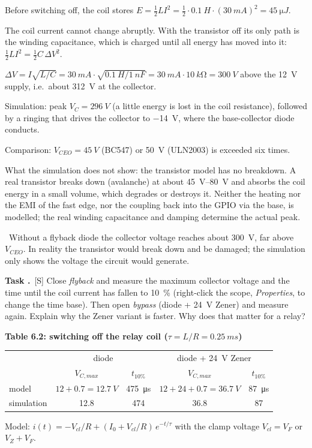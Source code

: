 \documentclass[a4paper,11pt]{article}
\newcounter{task}[section]
\renewcommand{\thetask}{\thesection.\arabic{task}}
\newcommand{\task}[1]{\par\medskip\refstepcounter{task}%
  {\sffamily\bfseries\color{rwuviolet}Task \thetask}\ {\sffamily\small\color{rwucyandark}[#1]}\quad}
\newenvironment{solution}{\begin{solbox}}{\end{solbox}}
\newcommand{\answer}{\par\smallskip{\sffamily\bfseries\color{rwuviolet}Answer:}\ }
\newcommand{\simv}[1]{\textcolor{rwuviolet}{#1}}
\newcommand{\simv}[1]{}
\newenvironment{results}[2]{\par\smallskip\begin{center}\small\sffamily
  {\color{rwucyandark}\bfseries #1}\\[1mm]\renewcommand{\arraystretch}{1.25}\begin{tabular}{#2}\toprule}
  {\bottomrule\end{tabular}\end{center}}
\begin{document}
\begin{solution}
\begin{steps}
  \item Before switching off, the coil stores $E=\tfrac12LI^2=\tfrac12\cdot\SI{0.1}{H}\cdot(\SI{30}{mA})^2=\SI{45}{\micro J}$.
  \item The coil current cannot change abruptly. With the transistor off its only path is the winding
        capacitance, which is charged until all energy has moved into it: $\tfrac12LI^2=\tfrac12C\,\Delta V^2$.
  \item $\Delta V=I\sqrt{L/C}=\SI{30}{mA}\cdot\sqrt{\SI{0.1}{H}/\SI{1}{nF}}=\SI{30}{mA}\cdot\SI{10}{k\ohm}=\SI{300}{V}$
        above the \SI{12}{V} supply, i.e.\ about \SI{312}{V} at the collector.
  \item Simulation: peak $V_C=\SI{296}{V}$ (a little energy is lost in the coil resistance), followed by a
        ringing that drives the collector to \SI{-14}{V}, where the base-collector diode conducts.
  \item Comparison: $V_{CEO}=\SI{45}{V}$ (BC547) or \SI{50}{V} (ULN2003) is exceeded six times.
  \item What the simulation does not show: the transistor model has no breakdown. A real transistor breaks down
        (avalanche) at about \SIrange{45}{80}{V} and absorbs the coil energy in a small volume, which degrades or
        destroys it. Neither the heating nor the EMI of the fast edge, nor the coupling back into the GPIO via
        the base, is modelled; the real winding capacitance and damping determine the actual peak.
\end{steps}
\answer Without a flyback diode the collector voltage reaches about \SI{300}{V}, far above $V_{CEO}$. In reality
the transistor would break down and be damaged; the simulation only shows the voltage the circuit would generate.
\end{solution}

\task{S} Close \emph{flyback} and measure the maximum collector voltage and the time until the coil current has
fallen to \SI{10}{\percent} (right-click the scope, \emph{Properties}, to change the time base). Then open
\emph{bypass} (diode + \SI{24}{V} Zener) and measure again. Explain why the Zener variant is faster. Why does that
matter for a relay?

\begin{results}{Table 6.2: switching off the relay coil ($\tau=L/R=\SI{0.25}{ms}$)}{lcccc}
  & \multicolumn{2}{c}{diode} & \multicolumn{2}{c}{diode + \SI{24}{V} Zener}\\
  & $V_{C,max}$ & $t_{10\%}$ & $V_{C,max}$ & $t_{10\%}$\\ \midrule
  model & $12+0.7=\SI{12.7}{V}$ & \SI{475}{\micro s} & $12+24+0.7=\SI{36.7}{V}$ & \SI{87}{\micro s}\\
  simulation & \simv{12.8} & \simv{474} & \simv{36.8} & \simv{87}\\
\end{results}
{\small Model: $i(t)=-V_{cl}/R+(I_0+V_{cl}/R)\,e^{-t/\tau}$ with the clamp voltage $V_{cl}=V_F$ or $V_Z+V_F$.}
\end{document}
